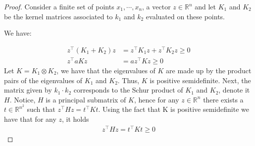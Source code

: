 \begin{proof}
    Consider a finite set of points $x_1, \cdots, x_n$, a vector $z \in \mathbb{R}^n$ and let $K_1$ and $K_2$ be the kernel matrices associated to $k_1$ and $k_2$ evaluated on these points.

    We have:

    $$  
    \begin{aligned}
    z^\intercal (K_1+K_2) z&= z^\intercal K_1 z + z^\intercal K_2 z \geq 0
    \\
    z^\intercal aK z&= a z^\intercal K z \geq 0
    \end{aligned}
    $$
    Let $K=K_1 \otimes K_2$, we have that the eigenvalues of $K$ are made up by the product pairs of the eigenvalues of $K_1$ and $K_2$. Thus, $K$ is positive semidefinite. Next, the matrix given by $k_1 \cdot k_2$ corresponds to the Schur product of $K_1$ and $K_2$, denote it $H$. Notice, $H$ is a principal submatrix of $K$, hence for any $z \in \mathbb{R}^n$ there exists a $t \in \mathbb{R}^{n^2}$ such that $z^\intercal H z= t^\intercal K t$. Using the fact that K is positive semidefinite we have that for any $z$, it holds 
    $$
    \begin{aligned}
        z^\intercal H z= t^\intercal K t\geq 0
    \end{aligned}
    $$
\end{proof}


